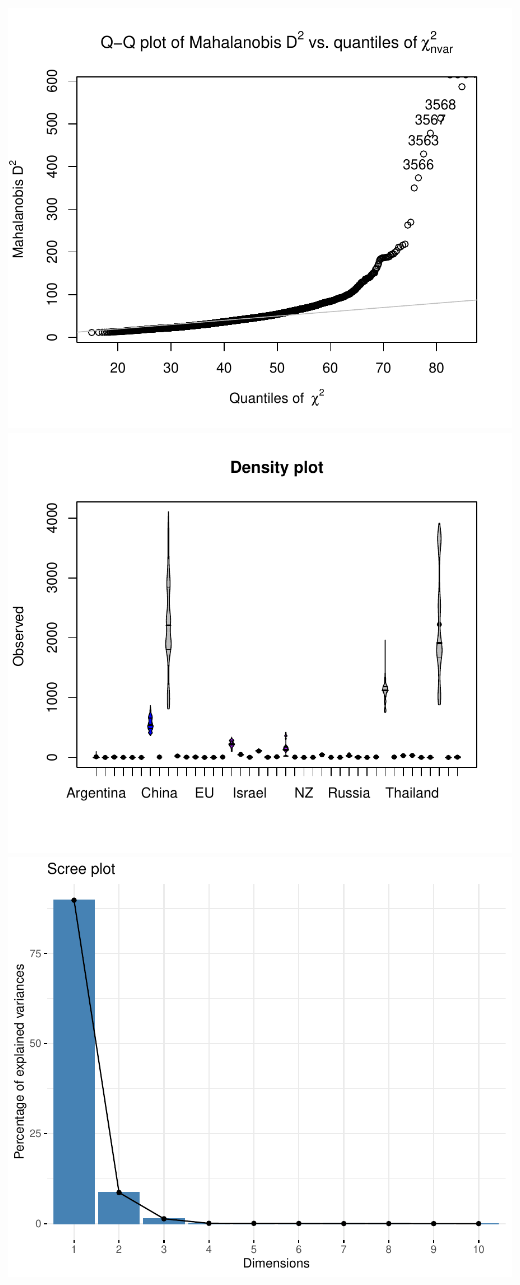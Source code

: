 \documentclass[11pt,preprint, authoryear]{elsarticle}
\numberwithin{equation}{section}
\numberwithin{figure}{section}
\numberwithin{table}{section}
\begin{document}
\includegraphics{Essay_files/figure-latex/unnamed-chunk-5-2.pdf}
\includegraphics{Essay_files/figure-latex/unnamed-chunk-5-3.pdf}
\includegraphics{Essay_files/figure-latex/unnamed-chunk-5-4.pdf}
\end{document}
